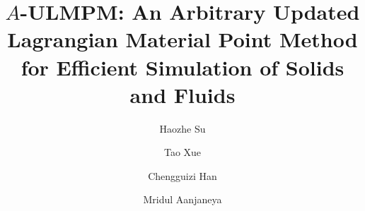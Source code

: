 \documentclass[acmtog]{acmart}
\begin{document}
\title{$A$-ULMPM: An Arbitrary Updated Lagrangian Material Point Method for Efficient Simulation of Solids and Fluids}
\author{Haozhe Su}

\author{Tao Xue}\authornotemark[1]

\author{Chengguizi Han}

\author{Mridul Aanjaneya}

\renewcommand\shortauthors{Haozhe Su, Tao Xue, Chengguizi Han, and Mridul Aanjaneya}

\end{document}
